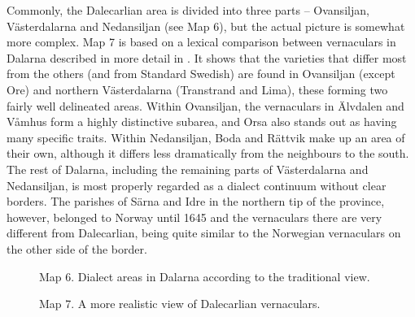 Commonly, the Dalecarlian area is divided into three parts – Ovansiljan, Västerdalarna and Nedansiljan (see Map 6), but the actual picture is somewhat more complex. Map 7 is based on a lexical comparison between vernaculars in Dalarna described in more detail in \citet{Dahl2005}. It shows that the varieties that differ most from the others (and from Standard Swedish) are found in Ovansiljan (except Ore) and northern Västerdalarna (Transtrand and Lima), these forming two fairly well delineated areas. Within Ovansiljan, the vernaculars in Älvdalen and Våmhus form a highly distinctive subarea, and Orsa also stands out as having many specific traits. Within Nedansiljan, Boda and Rättvik make up an area of their own, although it differs less dramatically from the neighbours to the south. The rest of Dalarna, including the remaining parts of Västerdalarna and Nedansiljan, is most properly regarded as a dialect continuum without clear borders. The parishes of Särna and Idre in the northern tip of the province, however, belonged to Norway until 1645 and the vernaculars there are very different from Dalecarlian, being quite similar to the Norwegian vernaculars on the other side of the border. 




\begin{figure}[h]

\begin{minipage}{6.42639in}

\label{bkm:Ref216765084}Map 6. Dialect areas in Dalarna according to the traditional view.


\end{minipage}

\end{figure}



\begin{figure}[h]

\begin{minipage}{6.07153in}

\label{bkm:Ref216765095}Map 7. A more realistic view of Dalecarlian vernaculars.


\end{minipage}

\end{figure}

